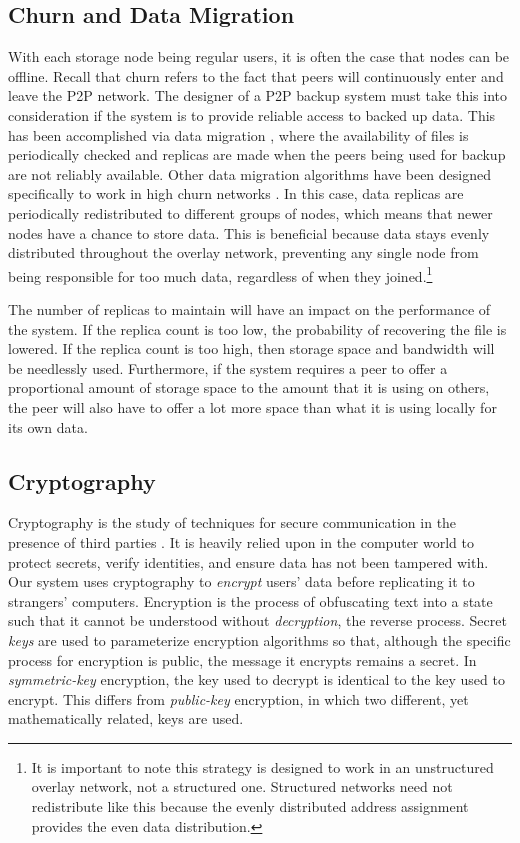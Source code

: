 \documentclass[12pt]{report}
\begin{document}
\subsection{Churn and Data Migration} \label{sec:churn}
With each storage node being regular users, it is often the case that nodes can be offline. Recall that churn refers to the fact that peers will continuously enter and leave the P2P network. The designer of a P2P backup system must take this into consideration if the system is to provide reliable access to backed up data. This has been accomplished via data migration \cite{pStore,PeerStore}, where the availability of files is periodically checked and replicas are made when the peers being used for backup are not reliably available. Other data migration algorithms have been designed specifically to work in high churn networks \cite{StorageSearchP2PNetworks}. In this case, data replicas are periodically redistributed to different groups of nodes, which means that newer nodes have a chance to store data. This is beneficial because data stays evenly distributed throughout the overlay network, preventing any single node from being responsible for too much data, regardless of when they joined.\footnote{It is important to note this strategy is designed to work in an unstructured overlay network, not a structured one. Structured networks need not redistribute like this because the evenly distributed address assignment provides the even data distribution.}

The number of replicas to maintain will have an impact on the performance of the system. If the replica count is too low, the probability of recovering the  file is lowered. If the replica count is too high, then storage space and bandwidth will be needlessly used. Furthermore, if the system requires a peer to offer a proportional amount of storage space to the amount that it is using on others, the peer will also have to offer a lot more space than what it is using locally for its own data. %

\subsection{Cryptography} \label{sec:crypto}
Cryptography is the study of techniques for secure communication in the presence of third parties \cite{cryptoDef}. It is heavily relied upon in the computer world to protect secrets, verify identities, and ensure data has not been tampered with. Our system uses cryptography to \textit{encrypt} users' data before replicating it to strangers' computers. Encryption is the process of obfuscating text into a state such that it cannot be understood without \textit{decryption}, the reverse process. Secret \textit{keys} are used to parameterize encryption algorithms so that, although the specific process for encryption is public, the message it encrypts remains a secret. In \textit{symmetric-key} encryption, the key used to decrypt is identical to the key used to encrypt. This differs from \textit{public-key} encryption, in which two different, yet mathematically related, keys are used.
\end{document}
